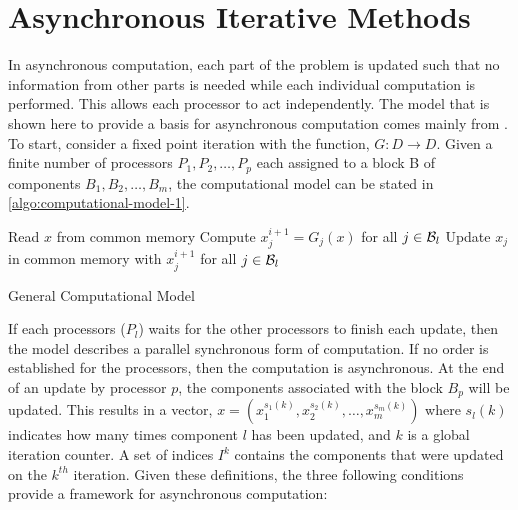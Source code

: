 \documentclass{article}
\theoremstyle{definition}
\theoremstyle{example}
\theoremstyle{example}
\theoremstyle{example}
\begin{document}
%
\section{Asynchronous Iterative Methods}
\label{sect:asynchronous-iterative-methods}

In asynchronous computation, each part of the problem is updated such that no information from other parts is needed while each individual computation is performed. This allows each processor to act independently. The model that is shown here to provide a basis for asynchronous computation comes mainly from \cite{frommer2000asynchronous}. To start, consider a fixed point iteration with the function, $G: D \rightarrow D$. Given a finite number of processors ${P_1, P_2, \ldots, P_p}$  each assigned to a block {\cal B} of components ${B_1, B_2, \ldots, B_m}$, the computational model can be stated in \cref{algo:computational-model-1}.

\begin{algorithm}
	\DontPrintSemicolon
	 {
		 {
			Read $x$ from common memory \;
			Compute $x_j^{i+1} = G_j(x)$ for all  $j \in {\cal B}_{l}$ \;
			Update $x_j$ in common memory with $x_j^{i+1}$ for all
			$j \in {\cal B}_{l}$ \;
		}
	}
	\caption{General Computational Model}
	\label{algo:computational-model-1}
\end{algorithm}

If each processors ($P_l$) waits for the other processors to finish each update, then the model describes a parallel synchronous form of computation. If no order is established for the processors, then the computation is asynchronous. At the end of an update by processor $p$, the components associated with the block $B_p$ will be updated. This results in a vector, $x = (x_1^{s_1(k)}, x_2^{s_2(k)}, \ldots, x_m^{s_m(k)})$ where $s_l(k)$ indicates how many times component $l$ has been updated, and $k$ is a global iteration counter. A set of indices $I^k$ contains the components that were updated on the $k^{th}$ iteration. Given these definitions, the three following conditions provide a framework for asynchronous computation:
\end{document}
